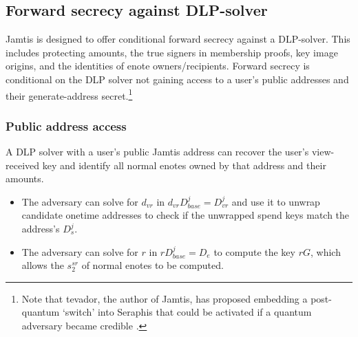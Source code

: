 \subsection{Forward secrecy against DLP-solver}
\label{subsec:jamtis-forward-secrecy-dlp-solver}

Jamtis is designed to offer conditional forward secrecy against a DLP-solver. This includes protecting amounts, the true signers in membership proofs, key image origins, and the identities of enote owners/recipients. Forward secrecy is conditional on the DLP solver not gaining access to a user's public addresses and their generate-address secret.\footnote{Note that tevador, the author of Jamtis, has proposed embedding a post-quantum `switch' into Seraphis that could be activated if a quantum adversary became credible \cite{seraphis-post-quantum-switch}.}

\subsubsection{Public address access}
\label{subsubsec:jamtis-forward-secrecy-address-access}

A DLP solver with a user's public Jamtis address can recover the user's view-received key and identify all normal enotes owned by that address and their amounts.
\begin{itemize}
    \item The adversary can solve for $d_{vr}$ in $d_{vr} D^j_{base} = D^j_{vr}$ and use it to unwrap candidate onetime addresses to check if the unwrapped spend keys match the address's $D^j_s$.

    \item The adversary can solve for $r$ in $r D^j_{base} = D_e$ to compute the key $r G$, which allows the $s^{sr}_2$ of normal enotes to be computed.
\end{itemize}

